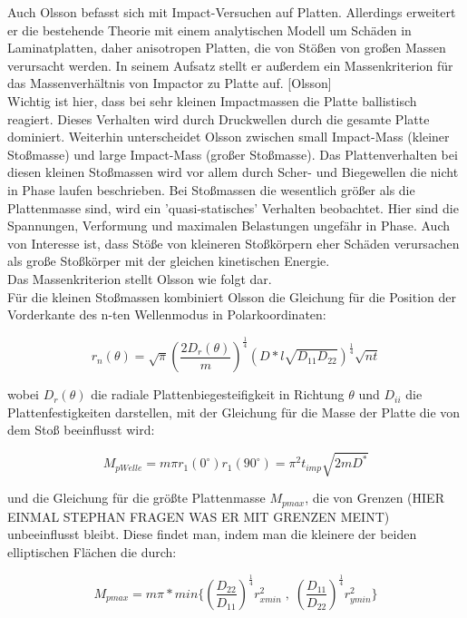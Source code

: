 Auch Olsson befasst sich mit Impact-Versuchen auf Platten. Allerdings erweitert er die bestehende Theorie mit einem analytischen Modell um Schäden in Laminatplatten, daher anisotropen Platten, die von Stößen von großen Massen verursacht werden. In seinem Aufsatz stellt er außerdem ein Massenkriterion für das Massenverhältnis von Impactor zu Platte auf. [Olsson]\\
Wichtig ist hier, dass bei sehr kleinen Impactmassen die Platte ballistisch reagiert. Dieses Verhalten wird durch Druckwellen durch die gesamte Platte dominiert. Weiterhin unterscheidet Olsson zwischen small Impact-Mass (kleiner Stoßmasse) und large Impact-Mass (großer Stoßmasse). Das Plattenverhalten bei diesen kleinen Stoßmassen wird vor allem durch Scher- und Biegewellen die nicht in Phase laufen beschrieben. Bei Stoßmassen die wesentlich größer als die Plattenmasse sind, wird ein 'quasi-statisches' Verhalten beobachtet. Hier sind die Spannungen, Verformung und maximalen Belastungen ungefähr in Phase. Auch von Interesse ist, dass Stöße von kleineren Stoßkörpern eher Schäden verursachen als große Stoßkörper mit der gleichen kinetischen Energie.\\
Das Massenkriterion stellt Olsson wie folgt dar.\\
Für die kleinen Stoßmassen kombiniert Olsson die Gleichung für die Position der Vorderkante des n-ten Wellenmodus in Polarkoordinaten:

\begin{equation}
	r_{n}(\theta) = \sqrt{\pi}(\frac{2D_{r}(\theta)}{m})^{\frac{1}{4}} (D*l\sqrt{D_{11}D_{22}})^{\frac{1}{4}}\sqrt{nt}
\end{equation}

wobei $D_{r}(\theta)$ die radiale Plattenbiegesteifigkeit in Richtung $\theta$ und $D_{ii}$ die Plattenfestigkeiten darstellen, mit der Gleichung für die Masse der Platte die von dem Stoß beeinflusst wird:

\begin{equation}
	M_{pWelle} = m \pi r_{1}(0^{\circ}) r_{1}(90^{\circ}) = \pi^{2} t_{imp} \sqrt{2mD^{*}}
\end{equation}

und die Gleichung für die größte Plattenmasse $M_{pmax}$, die von Grenzen (HIER EINMAL STEPHAN FRAGEN WAS ER MIT GRENZEN MEINT) unbeeinflusst bleibt. Diese findet man, indem man die kleinere der beiden elliptischen Flächen die durch:

\begin{equation}
	M_{pmax} = m \pi *min\{(\frac{D_{22}}{D_{11}})^{\frac{1}{4}} r_{xmin}^{2} \; , \; (\frac{D_{11}}{D_{22}})^{\frac{1}{4}} r_{ymin}^{2} \}
\end{equation}		
		
